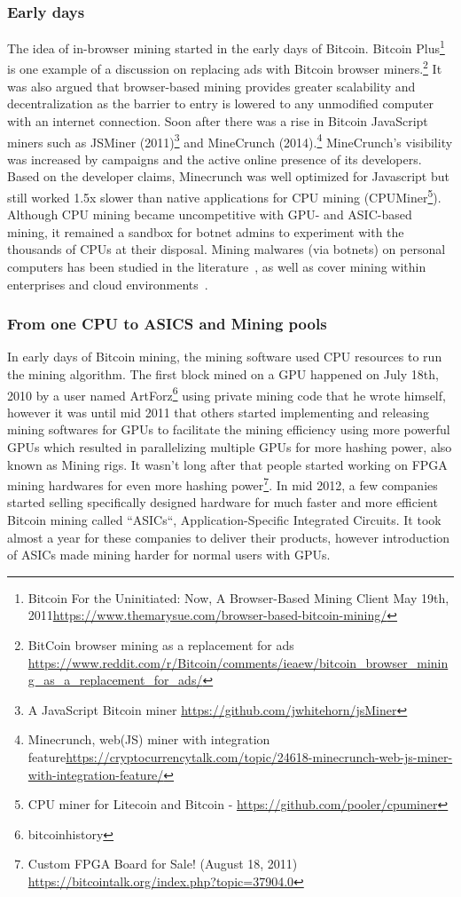 \subsubsection{Early days}
The idea of in-browser mining started in the early days of Bitcoin. Bitcoin Plus\footnote{Bitcoin For the Uninitiated: Now, A Browser-Based Mining Client  May 19th, 2011\url{https://www.themarysue.com/browser-based-bitcoin-mining/}} is one example of a discussion on replacing ads with Bitcoin browser miners.\footnote{BitCoin browser mining as a replacement for ads \url{https://www.reddit.com/r/Bitcoin/comments/ieaew/bitcoin_browser_mining_as_a_replacement_for_ads/}} It was also argued that browser-based mining provides greater scalability and decentralization as the barrier to entry is lowered to any unmodified computer with an internet connection. Soon after there was a rise in Bitcoin JavaScript miners such as JSMiner (2011)\footnote{A JavaScript Bitcoin miner \url{https://github.com/jwhitehorn/jsMiner}} and MineCrunch (2014).\footnote{Minecrunch, web(JS) miner with integration feature\url{https://cryptocurrencytalk.com/topic/24618-minecrunch-web-js-miner-with-integration-feature/}} MineCrunch's visibility was increased by campaigns and the active online presence of its developers. Based on the developer claims, Minecrunch was well optimized for Javascript but still worked 1.5x slower than native applications for CPU mining (\eg CPUMiner\footnote{CPU miner for Litecoin and Bitcoin - \url{https://github.com/pooler/cpuminer}}). Although CPU mining  became uncompetitive with GPU- and ASIC-based mining, it remained a sandbox for botnet admins to experiment with the thousands of CPUs at their disposal. Mining malwares (via botnets) on personal computers has been studied in the literature~\cite{huang2014botcoin,wyke2012zeroaccess}, as well as cover mining within enterprises and cloud environments~\cite{MiningonSOeDime2017}.


\subsubsection{From one CPU to ASICS and Mining pools}
In early days of Bitcoin mining, the mining software used CPU resources to run the mining algorithm. The first block mined on a GPU happened on July 18th, 2010 by a user named ArtForz\footnote{bitcoinhistory} using private mining code that he wrote himself, however it was until mid 2011 that others started implementing and releasing mining softwares for GPUs to facilitate the mining efficiency using more powerful GPUs which resulted in parallelizing multiple GPUs for more hashing power, also known as Mining rigs. It wasn't long after that people started working on FPGA mining hardwares for even more hashing power\footnote{Custom FPGA Board for Sale! (August 18, 2011) \url{https://bitcointalk.org/index.php?topic=37904.0}}. In mid 2012, a few companies started selling specifically designed hardware for much faster and more efficient Bitcoin mining called ``ASICs``, Application-Specific Integrated Circuits. It took almost a year for these companies to deliver their products, however introduction of ASICs made mining harder for normal users with GPUs.


